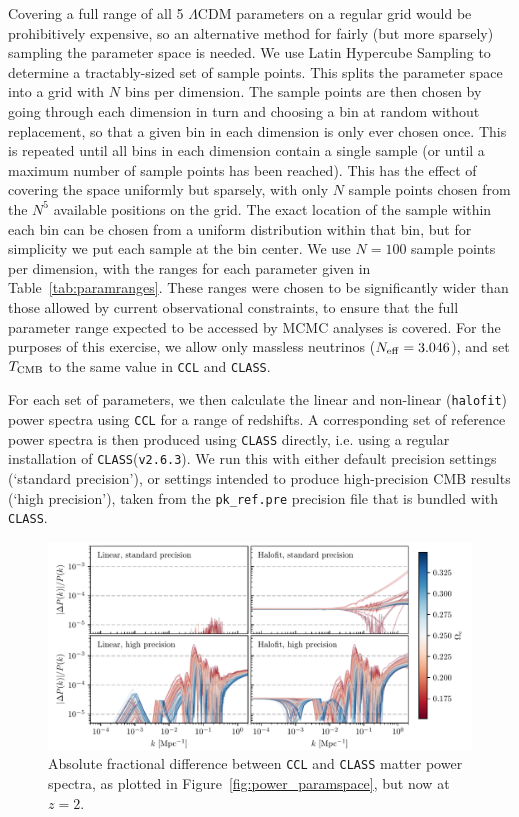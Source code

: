 \documentclass[\docopts]{\docclass}
\newcommand{\ccl}{{\tt CCL}\xspace}
\newcommand{\halofit}{{\tt halofit}\xspace}
\newcommand{\class}{{\tt CLASS}\xspace}
\begin{document}
Covering a full range of all 5 $\Lambda$CDM parameters on a regular grid would be prohibitively expensive, so an alternative method for fairly (but more sparsely) sampling the parameter space is needed. We use Latin Hypercube Sampling to determine a tractably-sized set of sample points. This splits the parameter space into a grid with $N$ bins per dimension. The sample points are then chosen by going through each dimension in turn and choosing a bin at random without replacement, so that a given bin in each dimension is only ever chosen once. This is repeated until all bins in each dimension contain a single sample (or until a maximum number of sample points has been reached). This has the effect of covering the space uniformly but sparsely, with only $N$ sample points chosen from the $N^5$ available positions on the grid. The exact location of the sample within each bin can be chosen from a uniform distribution within that bin, but for simplicity we put each sample at the bin center. We use $N=100$ sample points per dimension, with the ranges for each parameter given in Table~\ref{tab:paramranges}. These ranges were chosen to be significantly wider than those allowed by current observational constraints, to ensure that the full parameter range expected to be accessed by MCMC analyses is covered. For the purposes of this exercise, we allow only massless neutrinos ($N_{\rm eff} = 3.046$), and set $T_{\rm CMB}$ to the same value in \ccl and \class.
%


For each set of parameters, we then calculate the linear and non-linear (\halofit) power spectra using \ccl for a range of redshifts. A corresponding set of reference power spectra is then produced using \class directly, i.e. using a regular installation of \class ({\tt v2.6.3}). We run this with either default precision settings (`standard precision'), or settings intended to produce high-precision CMB results (`high precision'), taken from the {\tt pk\_ref.pre} precision file that is bundled with \class.

\begin{figure}
\centering
\includegraphics[width=1\textwidth]{pkdev_v2_z2_00}
\caption{Absolute fractional difference between \ccl and \class matter power spectra, as plotted in Figure~\ref{fig:power_paramspace}, but now at $z=2$.}
\label{fig:power_paramspace_z2}
\end{figure}
\end{document}
